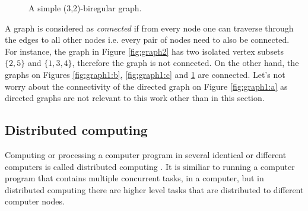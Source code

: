 \begin{figure}[h]
\centering
\caption{A simple (3,2)-biregular graph.\label{fig:graph3}}
\end{figure}

A graph is considered as \emph{connected} if from every node one can traverse through the edges to all other nodes i.e. every pair of nodes need to also be connected.
For instance, the graph in Figure \ref{fig:graph2} has two isolated vertex subsets $\{2, 5\}$ and $\{1, 3, 4\}$, therefore the graph is not connected.
On the other hand, the graphs on Figures \ref{fig:graph1:b}, \ref{fig:graph1:c} and \ref{fig:graph3} are connected.
Let's not worry about the connectivity of the directed graph on Figure \ref{fig:graph1:a} as directed graphs are not relevant to this work other than in this section.


\subsection{Distributed computing} \label{sec:distributed_computing}
Computing or processing a computer program in several identical or different computers is called distributed computing
\cite{DBLP:books/el/leeuwen90/LamportL90}.
It is similiar to running a computer program that contains multiple concurrent tasks, in a computer, but in distributed computing there are higher level tasks that are distributed to different computer nodes.

